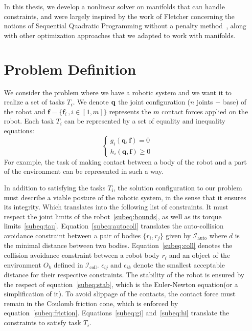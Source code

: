 In this thesis, we develop a nonlinear solver on manifolds that can handle constraints, and were largely inspired by the work of Fletcher concerning the notions of Sequential Quadratic Programming without a penalty method~\cite{Fletcher:ifip:2006, fletcher2010sequential, fletcher:mathprog:2000}, along with other optimization approaches that we adapted to work with manifolds.

\section{Problem Definition}
\label{sec:problem_definition}


We consider the problem where we have a robotic system and we want it to realize a set of tasks $T_i$.
We denote $\bf q$ the joint configuration ($n$ joints + base) of the robot and $\mathbf{f} =\{\mathbf{f}_i\,, i\in[1,m]\}$ represents the $m$ contact forces applied on the robot.
Each task $T_i$ can be represented by a set of equality and inequality equations:
\begin{equation}
  \left\{
    \begin{aligned}
    g_i(\mathbf{q},\mathbf{f}) = 0\\
    h_i(\mathbf{q},\mathbf{f}) \geq 0
    \end{aligned}
  \right.
\end{equation}
For example, the task of making contact between a body of the robot and a part of the environment can be represented in such a way.

In addition to satisfying the tasks $T_i$, the solution configuration to our problem must describe a viable posture of the robotic system, in the sense that it ensures its integrity.
Which translates into the following list of constraints.
It must respect the joint limits of the robot~\eqref{subeq:bounds}, as well as its torque limits~\eqref{subeq:tau}.
Equation~\eqref{subeq:autocoll} translates the auto-collision avoidance constraint between a pair of bodies $\{r_i, r_j\}$ given by $\mathcal{I}_\text{auto}$ where $d$ is the minimal distance between two bodies.
Equation~\eqref{subeq:coll} denotes the collision avoidance constraint between a robot body $r_i$ and an object of the environment $O_k$ defined in $\mathcal{I}_\text{coll}$.
$\epsilon_{ij}$ and $\epsilon_{ik}$ denote the smallest acceptable distance for their respective constraints.
The stability of the robot is ensured by the respect of equation~\eqref{subeq:stab}, which is the Euler-Newton equation(or a simplification of it).
To avoid slippage of the contacts, the contact force must remain in the Coulomb friction cone, which is enforced by equation~\eqref{subeq:friction}.
Equations~\eqref{subeq:gi} and~\eqref{subeq:hi} translate the constraints to satisfy task $T_i$.

